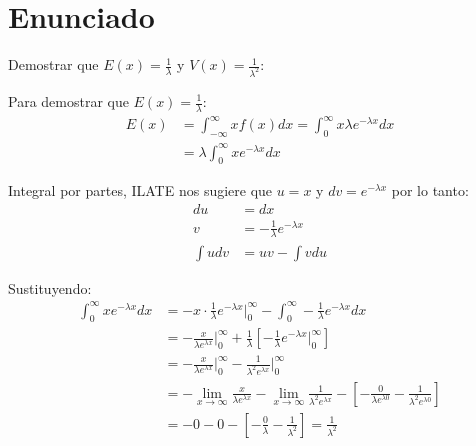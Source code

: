 \documentclass{templateNote}
\begin{document}
\portada
\margenes %

\section{Enunciado}
\indent
Demostrar que $E(x) = \displaystyle \frac{1}{\lambda}$ y $V(x) = \displaystyle \frac{1}{\lambda^2}$:

Para demostrar que $E(x) = \displaystyle \frac{1}{\lambda}$:
\begin{align*}
    E(x) &= \int_{- \infty}^{\infty} x f(x) dx = \int_{0}^{\infty} x \lambda e^{- \lambda x} dx \\
    &= \lambda \int_{0}^{\infty} x e^{- \lambda x} dx
\end{align*}

Integral por partes, ILATE nos sugiere que $u = x$ y $dv = e^{- \lambda x}$ por lo tanto:
\begin{align*}
    du &= dx \\
    v &= - \frac{1}{\lambda} e^{- \lambda x} \\
    \int{u dv} &= uv - \int v du
\end{align*}

Sustituyendo:
\begin{align*}
    \int_{0}^{\infty} x e^{- \lambda x} dx &= - x \cdot \frac{1}{\lambda} e^{- \lambda x} \Big|_{0}^{\infty} - \int_{0}^{\infty} - \frac{1}{\lambda} e^{- \lambda x} dx \\
    &= - \frac{x}{\lambda e^{\lambda x}} \Big|_{0}^{\infty} + \frac{1}{\lambda} \left[- \frac{1}{\lambda} e^{- \lambda x} \Big|_{0}^{\infty}\right] \\
    &= - \frac{x}{\lambda e^{\lambda x}} \Big|_{0}^{\infty} - \frac{1}{\lambda^2 e^{\lambda x}} \Big|_{0}^{\infty} \\
    &= - \lim_{x \to \infty} \frac{x}{\lambda e^{\lambda x}} - \lim_{x \to \infty} \frac{1}{\lambda^2 e^{\lambda x}} - \left[- \frac{0}{\lambda e^{\lambda 0}} - \frac{1}{\lambda^2 e^{\lambda 0}}\right] \\
    &= - 0 - 0 - \left[- \frac{0}{\lambda} - \frac{1}{\lambda^2}\right] = \frac{1}{\lambda^2}
\end{align*}
\end{document}

